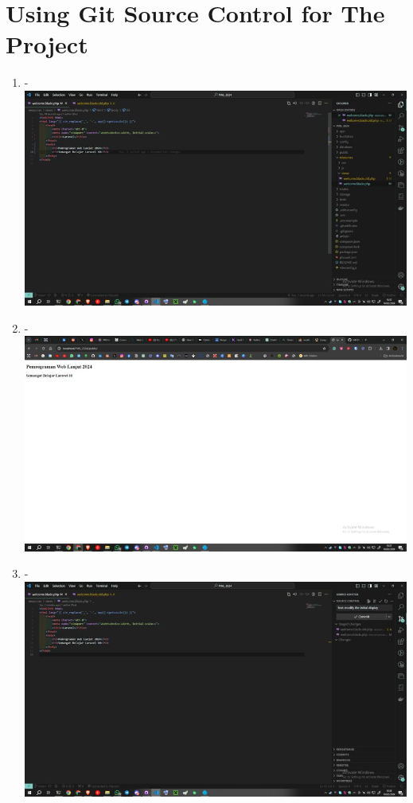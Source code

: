 \documentclass[12pt,titlepage]{article}
\begin{document}
\section{Using Git Source Control for The Project}

\begin{enumerate}[label= \alph*.]
    \item - \\ \includegraphics[width=.9\textwidth]{images/figures/Source Control 1.jpg}
    \item - \\ \includegraphics[width=.9\textwidth]{images/figures/Source Control 2.jpg}
    \newpage
    \item - \\ \includegraphics[width=.9\textwidth]{images/figures/Source Control 3.jpg}

\end{enumerate}
\end{document}
